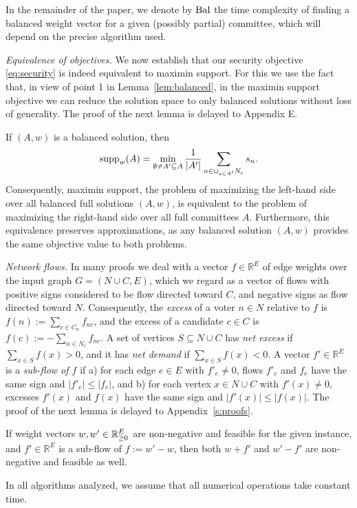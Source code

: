 \begin{remark}\label{rem:bal}
In the remainder of the paper, we denote by $\operatorname{Bal}$ the time complexity of finding a balanced weight vector for a given (possibly partial) committee, which will depend on the precise algorithm used.
\end{remark}

\emph{Equivalence of objectives.} 
We now establish that our security objective \eqref{eq:security} is indeed equivalent to maximin support.
For this we use the fact that, in view of point 1 in Lemma~\ref{lem:balanced}, in the maximin support objective we can reduce the solution space to only balanced solutions without loss of generality. 
The proof of the next lemma is delayed to Appendix E.

\begin{lemma} \label{lem:equivalence} 
If $(A,w)$ is a balanced solution, then
$$\operatorname{supp}_w(A) = \min_{\emptyset\neq A' \subseteq A} \frac{1}{|A'|} \sum_{n\in \cup_{c\in A'} N_c} s_n.$$
Consequently, maximin support, the problem of maximizing the left-hand side over all balanced full solutions $(A,w)$, 
is equivalent to the problem of maximizing the right-hand side over all full committees $A$. 
Furthermore, this equivalence preserves approximations, as any balanced solution $(A,w)$ provides the same objective value to both problems.
\end{lemma}

\emph{Network flows.}
In many proofs we deal with a vector $f\in\mathbb{R}^{E}$ of edge weights over the input graph $G=(N\cup C,E)$, which we regard as a vector of flows with positive signs considered to be flow directed toward $C$, and negative signs as flow directed toward $N$. 
Consequently, the \emph{excess} of a voter $n\in N$ relative to $f$ is $f(n):=\sum_{c\in C_n} f_{nc}$, and the excess of a candidate $c\in C$ is $f(c):= -\sum_{n\in N_c} f_{nc}$. 
A set of vertices $S\subseteq N\cup C$ has \emph{net excess} if $\sum_{x\in S} f(x)>0$, and it has \emph{net demand} if $\sum_{x\in S} f(x)<0$.    
A vector $f'\in\mathbb{R}^E$ is a \emph{sub-flow of $f$} if a) for each edge $e\in E$ with $f'_e\neq 0$, flows $f'_e$ and $f_e$ have the same sign and $|f'_e|\leq |f_e|$, and b) for each vertex $x\in N\cup C$ with $f'(x)\neq 0$, excesses $f'(x)$ and $f(x)$ have the same sign and $|f'(x)|\leq |f(x)|$. 
The proof of the next lemma is delayed to Appendix~\ref{s:proofs}.

\begin{lemma}\label{lem:subflow}
If weight vectors $w, w'\in\mathbb{R}_{\geq 0}^E$ are non-negative and feasible for the given instance, and $f'\in\mathbb{R}^E$ is a sub-flow of $f:=w'-w$, then both $w+f'$ and $w'-f'$ are non-negative and feasible as well.
\end{lemma}

\begin{remark}
In all algorithms analyzed, we assume that all numerical operations take constant time.
\end{remark}
